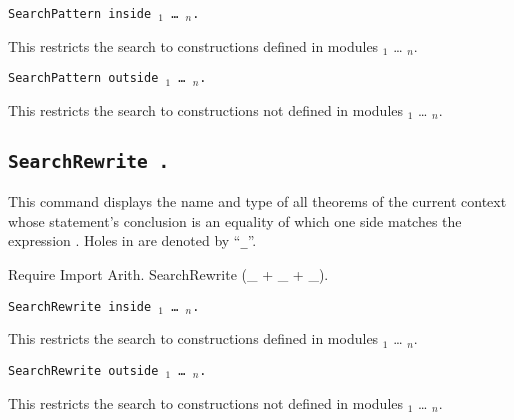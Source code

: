 \begin{Variants}
\item {\tt SearchPattern {\term} inside
{\module$_1$} \ldots{} {\module$_n$}.}

This restricts the search to constructions defined in modules
{\module$_1$} \ldots{} {\module$_n$}.

\item {\tt SearchPattern {\term} outside {\module$_1$} \ldots{} {\module$_n$}.}

This restricts the search to constructions not defined in modules
{\module$_1$} \ldots{} {\module$_n$}.

\end{Variants}

\subsection[\tt SearchRewrite {\term}.]{\tt SearchRewrite {\term}.}

This command displays the name and type of all theorems of the current
context whose statement's conclusion is an equality of which one side matches
the expression {\term}. Holes in {\term} are denoted by ``{\texttt \_}''.

\begin{coq_example}
Require Import Arith.
SearchRewrite (_ + _ + _).
\end{coq_example}

\begin{Variants}
\item {\tt SearchRewrite {\term} inside
{\module$_1$} \ldots{} {\module$_n$}.}

This restricts the search to constructions defined in modules
{\module$_1$} \ldots{} {\module$_n$}.

\item {\tt SearchRewrite {\term} outside {\module$_1$} \ldots{} {\module$_n$}.}

This restricts the search to constructions not defined in modules
{\module$_1$} \ldots{} {\module$_n$}.

\end{Variants}



